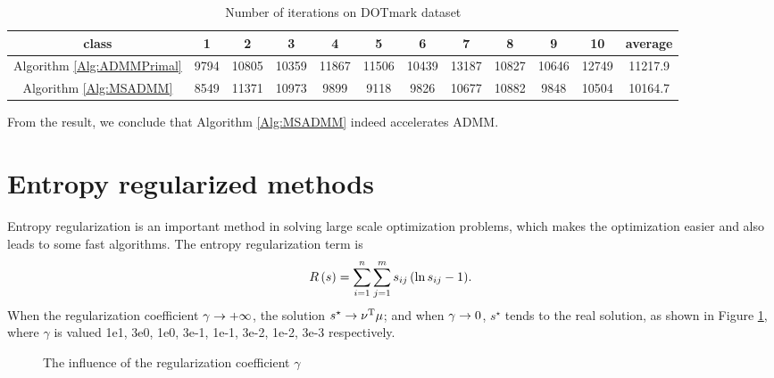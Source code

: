 \documentclass[english]{pkupaper}
\begin{document}
\begin{table}[htbp]
\centering \footnotesize
\begin{tabular}{|c|c|c|c|c|c|c|c|c|c|c|c|}
\hline
class & 1 & 2 & 3 & 4 & 5 & 6 & 7 & 8 & 9 & 10 & average \\ \hline
Algorithm \ref{Alg:ADMMPrimal} & 9794 & 10805 & 10359 & 11867 & 11506 & 10439 &13187 & 10827 & 10646 & 12749 & 11217.9 \\ \hline 
Algorithm \ref{Alg:MSADMM} & 8549 & 11371 & 10973 & 9899 & 9118 & 9826 & 10677 & 10882 & 9848 & 10504 & 10164.7 \\ \hline
\end{tabular}
\caption{Number of iterations on DOTmark dataset} \label{Tbl:ADOT}
\end{table}

From the result, we conclude that Algorithm \ref{Alg:MSADMM} indeed accelerates ADMM.

\section{Entropy regularized methods}

Entropy regularization \parencite{Benamou2015} is an important method in solving large scale optimization problems, which makes the optimization easier and also leads to some fast algorithms. The entropy regularization term is
\begin{equation}
R \left( s \right) = \sum_{ {i} = {1} }^{n}{\sum_{ {j} = {1} }^{m}{ s_{ i j } \left(  \ln s_{ i j } - 1  \right) }}.
\end{equation}
When the regularization coefficient $ \gamma \rightarrow +\infty $, the solution $ s^{\star} \rightarrow \nu^{\mathrm{T}} \mu $; and when $ \gamma \rightarrow 0 $, $s^{\star}$ tends to the real solution, as shown in Figure \ref{Fig:Gamma}, where $\gamma$ is valued 1e1, 3e0, 1e0, 3e-1, 1e-1, 3e-2, 1e-2, 3e-3 respectively.

\begin{figure}
\centering
\scalebox{0.25}{} 
\hspace{-0.8cm}
\scalebox{0.25}{}
\hspace{-0.8cm} 
\scalebox{0.25}{} 
\hspace{-0.8cm}
\scalebox{0.25}{} 
\scalebox{0.25}{} 
\hspace{-0.8cm}
\scalebox{0.25}{}
\hspace{-0.8cm}
\scalebox{0.25}{}
\hspace{-0.8cm} 
\scalebox{0.25}{}
\caption{The influence of the regularization coefficient $\gamma$} \label{Fig:Gamma}
\end{figure}
\end{document}
